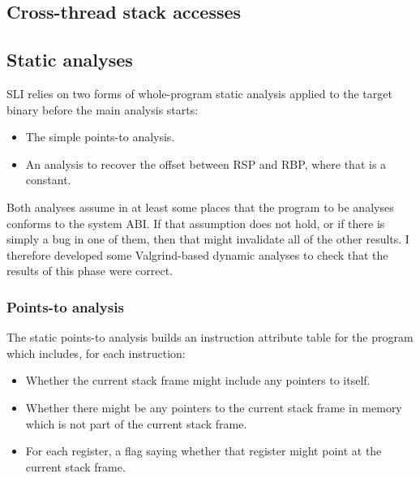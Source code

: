 \subsection{Cross-thread stack accesses}

\subsection{Static analyses}

SLI relies on two forms of whole-program static analysis applied to the target binary before the main analysis starts:

\begin{itemize}
\item
  The simple points-to analysis.
\item
  An analysis to recover the offset between RSP and RBP, where that is a constant.
\end{itemize}

Both analyses assume in at least some places that the program to be analyses conforms to the system ABI.
If that assumption does not hold, or if there is simply a bug in one of them, then that might invalidate all of the other results.
I therefore developed some Valgrind-based dynamic analyses to check that the results of this phase were correct.


\subsubsection{Points-to analysis}
\label{sect:eval:validate:pta}

The static points-to analysis builds an instruction attribute table
for the program which includes, for each instruction:

\begin{itemize}
\item
  Whether the current stack frame might include any pointers to itself.
\item
  Whether there might be any pointers to the current stack frame in memory which is not part of the current stack frame.
\item
  For each register, a flag saying whether that register might point at the current stack frame.
\end{itemize}

